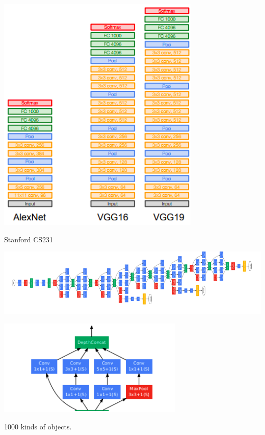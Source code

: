 {
\centerline{\includegraphics[height=4.5in]{../images/VGGStack}}
\centerline{\large Stanford CS231}


\centerline{\includegraphics[width = 9.0in]{../images/inception1}}
\vfill
\centerline{\includegraphics[width = 3.5in]{../images/inception2}}


1000 kinds of objects.

}

